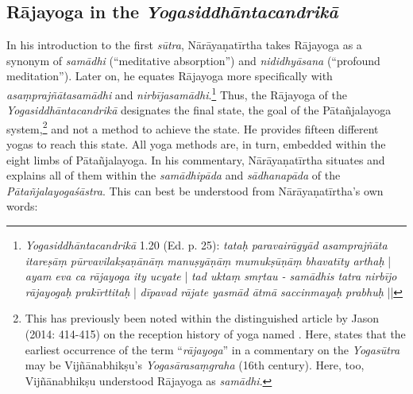 \subsection{Rājayoga in the \emph{Yogasiddhāntacandrikā}}
\label{rajacandrika}
In his introduction to the first \textit{sūtra}, Nārāyaṇatīrtha takes Rājayoga as a synonym of \textit{samādhi} (``meditative absorption'') and \textit{nididhyāsana} (``profound meditation''). Later on, he equates Rājayoga more specifically with \textit{asaṃprajñātasamādhi} and \textit{nirbījasamādhi}.\footnote{\textit{Yogasiddhāntacandrikā} 1.20 (Ed. p. 25): \textit{tataḥ paravairāgyād asamprajñāta itareṣāṃ pūrvavilakṣaṇānāṃ manuṣyāṇāṃ mumukṣūṇāṃ bhavatīty arthaḥ} | \textit{ayam eva ca rājayoga ity ucyate} | \textit{tad uktaṃ smṛtau - samādhis tatra nirbījo rājayogaḥ prakīrttitaḥ} | \textit{dīpavad rājate yasmād ātmā saccinmayaḥ prabhuḥ} ||} Thus, the Rājayoga of the \emph{Yogasiddhāntacandrikā} designates the final state, the goal of the Pātañjalayoga system,\footnote{This has previously been noted within the distinguished article by Jason \citeauthor{birch2014} (2014: 414-415) on the reception history of yoga named . Here, \citeauthor{birch2014} states that the earliest occurrence of the term ``\textit{rājayoga}'' in a commentary on the \emph{Yogasūtra} may be Vijñānabhikṣu’s \textit{Yogasārasaṃgraha} (16th century). Here, too, Vijñānabhikṣu understood Rājayoga as \textit{samādhi}.} and not a method to achieve the state. He provides fifteen different yogas to reach this state. All yoga methods are, in turn, embedded within the eight limbs of Pātañjalayoga. In his commentary, Nārāyaṇatīrtha situates and explains all of them within the \textit{samādhipāda} and \textit{sādhanapāda} of the \emph{Pātañjalayogaśāstra}. This can best be understood from Nārāyaṇatīrtha's own words: 

